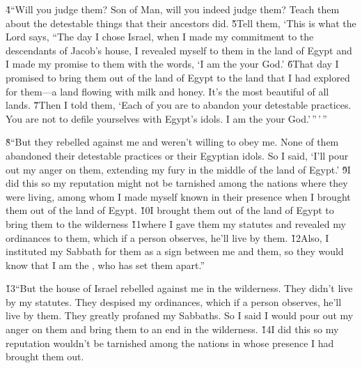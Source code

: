 \v{4}``Will you judge them? Son of Man, will you indeed judge them? Teach them about the detestable things that their ancestors did. \v{5}Tell them, `This is what the Lord  says, ``The day I chose Israel, when I made my commitment to the descendants of Jacob's house, I revealed myself to them in the land of Egypt and I made my promise to them with the words, `I am the  your God.' \v{6}That day I promised to bring them out of the land of Egypt to the land that I had explored for them---a land flowing with milk and honey. It's the most beautiful of all lands. \v{7}Then I told them, `Each of you are to abandon your detestable practices. You are not to defile yourselves with Egypt's idols. I am the  your God.'\,''\,'\,''

\v{8}``But they rebelled against me and weren't willing to obey me. None of them abandoned their detestable practices or their Egyptian idols. So I said, `I'll pour out my anger on them, extending my fury in the middle of the land of Egypt.' \v{9}I did this so my reputation might not be tarnished among the nations where they were living, among whom I made myself known in their presence when I brought them out of the land of Egypt. \v{10}I brought them out of the land of Egypt to bring them to the wilderness \v{11}where I gave them my statutes and revealed my ordinances to them, which if a person observes, he'll live by them. \v{12}Also, I instituted my Sabbath for them as a sign between me and them, so they would know that I am the , who has set them apart.''

\v{13}``But the house of Israel rebelled against me in the wilderness. They didn't live by my statutes. They despised my ordinances, which if a person observes, he'll live by them. They greatly profaned my Sabbaths. So I said I would pour out my anger on them and bring them to an end in the wilderness. \v{14}I did this so my reputation wouldn't be tarnished among the nations in whose presence I had brought them out.

